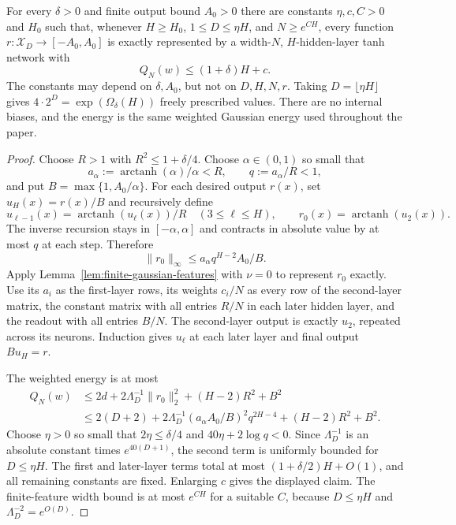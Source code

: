 \begin{theorem}
\label{thm:near-baseline-memorizer}
For every $\delta>0$ and finite output bound $A_0>0$ there are constants $\eta,c,C>0$ and $H_0$ such that, whenever $H\ge H_0$, $1\le D\le\eta H$, and $N\ge e^{CH}$, every function $r:\mathcal X_D\to[-A_0,A_0]$ is exactly represented by a width-$N$, $H$-hidden-layer tanh network with
\[
 Q_N(w)\le(1+\delta)H+c.
\]
The constants may depend on $\delta,A_0$, but not on $D,H,N,r$. Taking $D=\lfloor\eta H\rfloor$ gives $4\cdot2^D=\exp(\Omega_\delta(H))$ freely prescribed values. There are no internal biases, and the energy is the same weighted Gaussian energy used throughout the paper.
\end{theorem}
\begin{proof}
Choose $R>1$ with $R^2\le1+\delta/4$. Choose $\alpha\in(0,1)$ so small that
\[
 a_\alpha:=\operatorname{arctanh}(\alpha)/\alpha<R,
 \qquad q:=a_\alpha/R<1,
\]
and put $B=\max\{1,A_0/\alpha\}$. For each desired output $r(x)$, set $u_H(x)=r(x)/B$ and recursively define
\[
 u_{\ell-1}(x)=\operatorname{arctanh}(u_\ell(x))/R
       \quad(3\le\ell\le H),\qquad
 r_0(x)=\operatorname{arctanh}(u_2(x)).
\]
The inverse recursion stays in $[-\alpha,\alpha]$ and contracts in absolute value by at most $q$ at each step. Therefore
\[
 \|r_0\|_\infty\le a_\alpha q^{H-2}A_0/B.
\]
Apply Lemma~\ref{lem:finite-gaussian-features} with $\nu=0$ to represent $r_0$ exactly. Use its $a_i$ as the first-layer rows, its weights $c_i/N$ as every row of the second-layer matrix, the constant matrix with all entries $R/N$ in each later hidden layer, and the readout with all entries $B/N$.
The second-layer output is exactly $u_2$, repeated across its neurons. Induction gives $u_\ell$ at each later layer and final output $B u_H=r$.

The weighted energy is at most
\begin{align*}
 Q_N(w)&\le2d+2\Lambda_D^{-1}\|r_0\|_2^2
                  +(H-2)R^2+B^2\\
 &\le2(D+2)+2\Lambda_D^{-1}
       (a_\alpha A_0/B)^2 q^{2H-4}+(H-2)R^2+B^2.
\end{align*}
Choose $\eta>0$ so small that $2\eta\le\delta/4$ and
$40\eta+2\log q<0$. Since $\Lambda_D^{-1}$ is an absolute constant times $e^{40(D+1)}$, the second term is uniformly bounded for $D\le\eta H$. The first and later-layer terms total at most $(1+\delta/2)H+O(1)$, and all remaining constants are fixed. Enlarging $c$ gives the displayed claim. The finite-feature width bound is at most $e^{CH}$ for a suitable $C$, because $D\le\eta H$ and $\Lambda_D^{-2}=e^{O(D)}$.
\end{proof}

